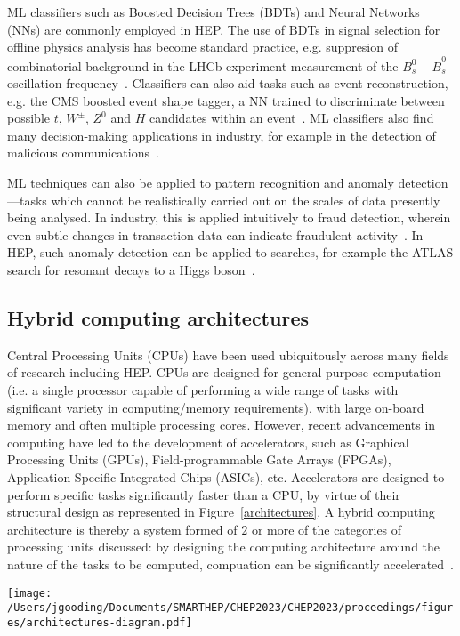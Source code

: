 ML classifiers such as Boosted Decision Trees (BDTs) and Neural Networks (NNs) are commonly employed in HEP. The use of BDTs in signal selection for offline physics analysis has become standard practice, e.g. suppresion of combinatorial background in the LHCb experiment measurement of the $B_s^0-\bar{B}_s^0$ oscillation frequency~\cite{delta-ms}. Classifiers can also aid tasks such as event reconstruction, e.g. the CMS boosted event shape tagger, a NN trained to discriminate between possible $t$, $W^\pm$, $Z^0$ and $H$ candidates within an event~\cite{CMS-best}. ML classifiers also find many decision-making applications in industry, for example in the detection of malicious communications~\cite{classifier-phishing}.

ML techniques can also be applied to pattern recognition and anomaly detection—tasks which cannot be realistically carried out on the scales of data presently being analysed. In industry, this is applied intuitively to fraud detection, wherein even subtle changes in transaction  data can indicate fraudulent activity~\cite{fraud-detection}. In HEP, such anomaly detection can be applied to searches, for example the ATLAS search for resonant decays to a Higgs boson~\cite{anomaly-hep}.

\subsection{Hybrid computing architectures}
\label{hybrid-architectures}
Central Processing Units (CPUs) have been used ubiquitously across many fields of research including HEP. CPUs are designed for general purpose computation (i.e. a single processor capable of performing a wide range of tasks with significant variety in computing/memory requirements), with large on-board memory and often multiple processing cores. However, recent advancements in computing have led to the development of accelerators, such as Graphical Processing Units (GPUs), Field-programmable Gate Arrays (FPGAs), Application-Specific Integrated Chips (ASICs), etc. Accelerators are designed to perform specific tasks significantly faster than a CPU, by virtue of their structural design as represented in Figure~\ref{architectures}. A hybrid computing architecture is thereby a system formed of $2$ or more of the categories of processing units discussed: by designing the computing architecture around the nature of the tasks to be computed, compuation can be significantly accelerated~\cite{architectures}.

\begin{figure*}[h!]
    \centering
    \texttt{[image: /Users/jgooding/Documents/SMARTHEP/CHEP2023/CHEP2023/proceedings/figures/architectures-diagram.pdf]}
    \caption{Comparison of CPU, GPU and FPGA architectures, illustrated as schematic diagrams. GPUs typically contain a greater proportion of computational resources than CPUs, with these resources subdivided within each multiprocessor to provide better parallel computing performance. FPGAs take a different approach, comprising of many control blocks connected to memoery/IO interface and to one another via switches~\cite{architectures}.}
    \label{architectures}
\end{figure*}

